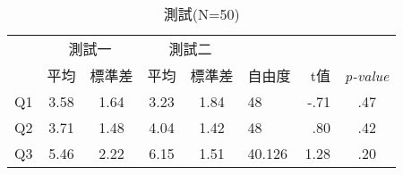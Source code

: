 \begin{table}[htbp]
\centering
\caption{測試(N=50)}
\label{4-4}
\begin{adjustbox}{max width=\textwidth}
\begin{tabular}{@{}ccccclrc@{}}
\toprule
 & \multicolumn{2}{c}{測試一} & \multicolumn{2}{c}{測試二} &  &  &  \\ \cmidrule(lr){2-5}
 & 平均 & 標準差 & 平均 & 標準差 & 自由度 & t值 & \textit{p-value} \\ \midrule
Q1 & 3.58 & 1.64 & 3.23 & 1.84 & 48 & -.71 & .47 \\
Q2 & 3.71 & 1.48 & 4.04 & 1.42 & 48 & .80 & .42 \\
Q3 & 5.46 & 2.22 & 6.15 & 1.51 & 40.126 & 1.28 & .20 \\ \bottomrule
\end{tabular}
\end{adjustbox}
\end{table}